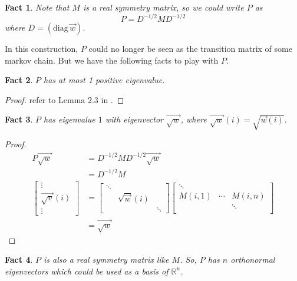\documentclass{article}
\newtheorem{fact}{Fact}[section]
\def\diag#1{(\mathrm{diag}\,#1)}
\begin{document}
\begin{fact}
  Note that $M$ is a real symmetry matrix, so we could write $P$ as
  \[P = D^{-1/2}MD^{-1/2}\]
  where $D = \diag{\vec{w}}$.
\end{fact}
  In this construction, $P$ could no longer be seen as the transition matrix of some markov chain. But we have the following facts to play with $P$.
\begin{fact}
  $P$ has at most 1 positive eigenvalue.
\end{fact}
\begin{proof}
  refer to Lemma 2.3 in \cite{anari2019log}.
\end{proof}
\begin{fact}
  $P$ has eigenvalue $1$ with eigenvector $\vec{\sqrt{w}}$, where $\vec{\sqrt{w}}(i) = \sqrt{\vec{w}(i)}$.
\end{fact}
\begin{proof}
  \begin{align*}
    P\vec{\sqrt{w}}
    &= D^{-1/2}MD^{-1/2}\vec{\sqrt{w}} \\
    &= D^{-1/2}M\\
    \left[
    \begin{array}{c}
      \vdots \\
      \vec{\sqrt{v}}(i) \\
      \vdots
    \end{array}
    \right]
    &= \left[
      \begin{array}{ccc}
        \ddots&& \\
        &\sqrt{\vec{w}}(i)&\\
        &&\ddots
      \end{array}
      \right]
    \left[
           \begin{array}{ccc}
             \ddots &   &  \\
             M(i, 1) & \cdots & M(i, n) \\
              &  &  \ddots\\
           \end{array}
    \right] \\
    &= \vec{\sqrt{w}}
  \end{align*}
\end{proof}

\begin{fact}
  $P$ is also a real symmetry matrix like $M$.
  So, $P$ has $n$ orthonormal eigenvectors which could be used as a basis of $\mathbb{R}^n$.
\end{fact}
\end{document}
